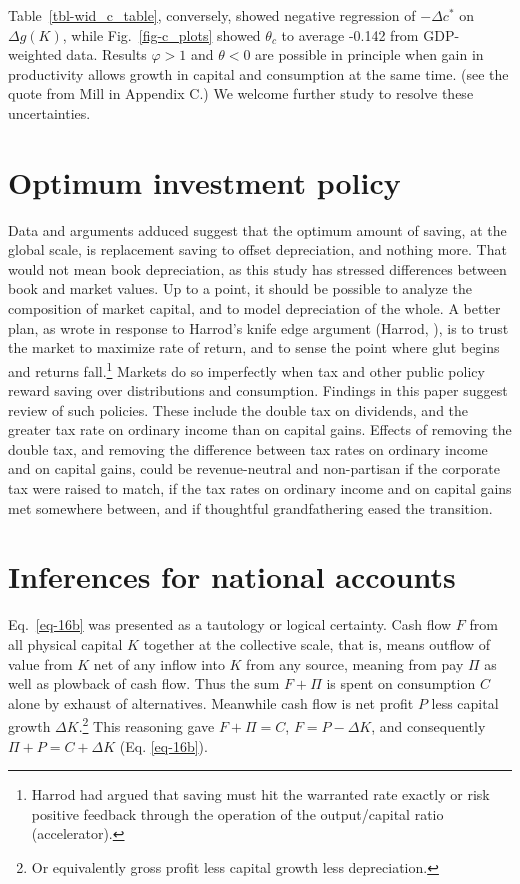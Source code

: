 \documentclass[a4paper,fleqn]{latex_styles/cas-sc}
\begin{document}
Table~\ref{tbl-wid_c_table}, conversely, showed negative regression of \(-\Delta c^*\) on \(\Delta g(K)\), while Fig.~\ref{fig-c_plots} showed \(\theta_c\) to average -0.142
from GDP-weighted data. Results \(\varphi > 1\) and \(\theta < 0\) are possible in principle when gain in productivity allows growth in capital and consumption at the same time. (see the quote from Mill in Appendix C.) We welcome further study to resolve these uncertainties.

\hypertarget{optimum-investment-policy}{%
\section{Optimum investment policy}\label{optimum-investment-policy}}

Data and arguments adduced suggest that the optimum amount of
saving, at the global scale, is replacement saving to offset depreciation, and nothing
more. That would not mean book depreciation, as this study has stressed
differences between book and market values. Up to a point, it should be
possible to analyze the composition of market capital, and to model
depreciation of the whole. A better plan, as
\citet{solowContributionTheoryEconomic1956a} wrote in response to
Harrod's knife edge argument (Harrod, \citeyear{harrodEssayDynamicTheory1939}), is to
trust the market to maximize rate of return, and to sense the point
where glut begins and returns fall.\footnote{Harrod had argued that
saving must hit the warranted rate exactly or risk positive
feedback through the operation of the output/capital ratio
(accelerator).}
%
Markets do so imperfectly when tax and other public policy reward
saving over distributions and consumption. Findings in this paper
suggest review of such policies. These include the double tax on
dividends, and the greater tax rate on ordinary income than on capital
gains. Effects of removing the double tax, and removing the difference
between tax rates on ordinary income and on capital gains, could be
revenue-neutral and non-partisan if the corporate tax were raised to
match, if the tax rates on ordinary income and on capital gains met
somewhere between, and if thoughtful grandfathering eased the
transition.

\section{Inferences for national accounts}

Eq.~\eqref{eq-16b} was presented as a tautology or logical certainty. Cash flow \(F\) from all physical capital \(K\) together at the collective scale, that is, means outflow of value from \(K\) net of any inflow into \(K\) from any source, meaning from pay \(\Pi\) as well as plowback of cash flow. Thus the sum \(F+\Pi\) is spent on consumption \(C\) alone by exhaust of alternatives. Meanwhile cash flow is net profit \(P\) less capital growth \(\Delta K\).\footnote{Or equivalently gross profit less capital growth less depreciation.} This reasoning gave \(F+\Pi = C\), \(F = P - \Delta K\), and consequently \(\Pi + P = C + \Delta K\) (Eq. \eqref{eq-16b}).
\end{document}
